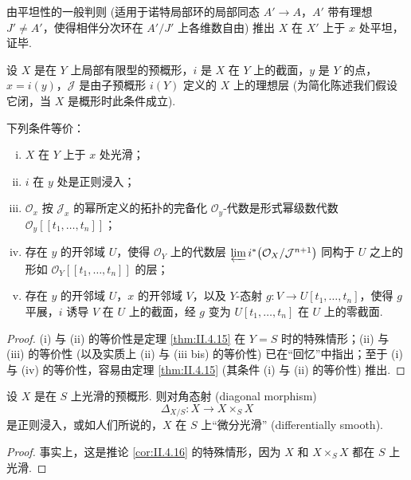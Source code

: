由平坦性的一般判则 (适用于诺特局部环的局部同态 $A' \to A$，$A'$ 带有理想 $J' \neq A'$，使得相伴分次环在 $A'/J'$ 上各维数自由) 推出 $X$ 在 $X'$ 上于 $x$ 处平坦，证毕.

\begin{corollary}\label{cor:II.4.17}
设 $X$ 是在 $Y$ 上局部有限型的预概形，$i$ 是 $X$ 在 $Y$ 上的截面，$y$ 是 $Y$ 的点，$x = i(y)$，$\mathcal{J}$ 是由子预概形 $i(Y)$ 定义的 $X$ 上的理想层 (为简化陈述我们假设它闭，当 $X$ 是概形时此条件成立).

下列条件等价：
\begin{enumerate}[(i)]
\item $X$ 在 $Y$ 上于 $x$ 处光滑；
\item $i$ 在 $y$ 处是正则浸入；
\item $\mathcal{O}_x$ 按 $\mathcal{J}_x$ 的幂所定义的拓扑的完备化 $\mathcal{O}_y$-代数是形式幂级数代数 $\mathcal{O}_y[\![t_1, \dots, t_n]\!]$；
\item[(iii bis)] 存在 $y$ 的开邻域 $U$，使得 $\mathcal{O}_Y$ 上的代数层 $\varprojlim i^{*}\bigl(\mathcal{O}_X/\mathcal{J}^{n+1}\bigr)$ 同构于 $U$ 之上的形如 $\mathcal{O}_Y[\![t_1, \dots, t_n]\!]$ 的层；
\item 存在 $y$ 的开邻域 $U$，$x$ 的开邻域 $V$，以及 $Y$-态射 $g \colon V \to U[t_1, \dots, t_n]$，使得 $g$ 平展，$i$ 诱导 $V$ 在 $U$ 上的截面，经 $g$ 变为 $U[t_1, \dots, t_n]$ 在 $U$ 上的零截面.
\end{enumerate}
\end{corollary}

\begin{proof}
(i) 与 (ii) 的等价性是定理 \ref{thm:II.4.15} 在 $Y = S$ 时的特殊情形；(ii) 与 (iii) 的等价性 (以及实质上 (ii) 与 (iii bis) 的等价性) 已在``回忆''中指出；至于 (i) 与 (iv) 的等价性，容易由定理 \ref{thm:II.4.15} (其条件 (i) 与 (ii) 的等价性) 推出.
\end{proof}

\begin{corollary}\label{cor:II.4.18}
设 $X$ 是在 $S$ 上光滑的预概形. 则对角态射 (diagonal morphism)
\[
\Delta_{X/S} \colon X \longrightarrow X \times_S X
\]
是正则浸入，或如人们所说的，$X$ 在 $S$ 上``微分光滑'' (differentially smooth).
\end{corollary}

\begin{proof}
事实上，这是推论 \ref{cor:II.4.16} 的特殊情形，因为 $X$ 和 $X \times_S X$ 都在 $S$ 上光滑.
\end{proof}

